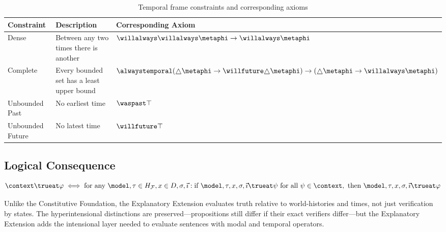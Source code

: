 \documentclass[../LogosReference.tex]{subfiles}
\begin{document}
\begin{table}[h]
	\centering
	\begin{tabular}{lll}
		\toprule
		\textbf{Constraint} & \textbf{Description}                      & \textbf{Corresponding Axiom}                                                                                    \\
		\midrule
		Dense               & Between any two times there is another    & $\willalways\willalways\metaphi \to \willalways\metaphi$                                                        \\
		Complete            & Every bounded set has a least upper bound & $\alwaystemporal(\always\metaphi \to \willfuture\always\metaphi) \to (\always\metaphi \to \willalways\metaphi)$ \\
		Unbounded Past      & No earliest time                          & $\waspast\top$                                                                                                  \\
		Unbounded Future    & No latest time                            & $\willfuture\top$                                                                                               \\
		\bottomrule
	\end{tabular}
	\caption{Temporal frame constraints and corresponding axioms}
	\label{tab:temporal-constraints}
\end{table}


\subsection{Logical Consequence}\label{sec:logical-consequence-core}

\begin{definition}\label{def:consequence-core}
	\[
		\context \trueat \metaA \iff \text{for any } \model, \history \in \historyspace, x \in D, \assignment, \tempindex: \text{if } \model, \history, x, \assignment, \tempindex \trueat \metaB \text{ for all } \metaB \in \context, \text{ then } \model, \history, x, \assignment, \tempindex \trueat \metaA
	\]
\end{definition}

\begin{remark}
	Unlike the Constitutive Foundation, the Explanatory Extension evaluates truth relative to world-histories and times, not just verification by states.
	The hyperintensional distinctions are preserved---propositions still differ if their exact verifiers differ---but the Explanatory Extension adds the intensional layer needed to evaluate sentences with modal and temporal operators.
\end{remark}
\end{document}
